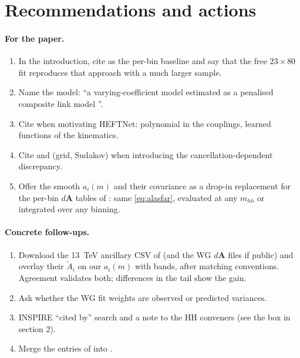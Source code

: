 \section{Recommendations and actions}
\label{sec:actions}

\paragraph{For the paper.}
\begin{enumerate}
  \item In the introduction, cite \cite{Buchalla2018,Heinrich2020,Alasfar2023} as the
    per-bin baseline and say that the free $23\times80$ fit reproduces that approach with a
    much larger sample.
  \item Name the model: ``a varying-coefficient model \cite{HastieTibshirani1993} estimated
    as a penalised composite link model \cite{Eilers2007,Rizzi2015}''.
  \item Cite \cite{Chen2021,Brehmer2018} when motivating HEFTNet: polynomial in the
    couplings, learned functions of the kinematics.
  \item Cite \cite{Cadamuro2025} and \cite{Heinrich2020} (grid, Sudakov) when introducing the
    cancellation-dependent discrepancy.
  \item Offer the smooth $a_i(m)$ and their covariance as a drop-in replacement for the
    per-bin $d\textbf{A}$ tables of \cite{Alasfar2023}: same \cref{eq:alasfar}, evaluated at
    any $m_{hh}$ or integrated over any binning.
\end{enumerate}

\paragraph{Concrete follow-ups.}
\begin{enumerate}
  \item Download the 13~TeV ancillary CSV of \cite{Buchalla2018} (and the WG $d\textbf{A}$
    files if public) and overlay their $\tilde A_i$ on our $a_i(m)$ with bands, after
    matching conventions. Agreement validates both; differences in the tail show the gain.
  \item Ask whether the WG fit weights are observed or predicted variances.
  \item INSPIRE ``cited by'' search and a note to the HH conveners (see the box in section 2).
  \item Merge the entries of  into
    .
\end{enumerate}



